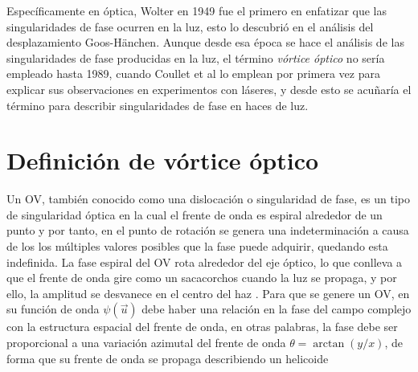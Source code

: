 
Específicamente en óptica, Wolter en 1949 \cite{Wolter1950}fue el primero en enfatizar que las singularidades de fase ocurren en la luz, esto lo descubrió en el análisis del desplazamiento Goos-Hänchen. Aunque desde esa época se hace el análisis de las singularidades de fase producidas en la luz, el término \textit{vórtice óptico} no sería empleado hasta 1989, cuando Coullet et al \cite{Coullet1994} lo emplean por primera vez para explicar sus observaciones en experimentos con láseres, y desde esto se acuñaría el término para describir singularidades de fase en haces de luz.

\section{Definición de vórtice óptico}
\label{sec:vortice_optico}

Un OV, también conocido como una dislocación o singularidad de fase, es un tipo de singularidad óptica en la cual el frente de onda es espiral alrededor de un punto y por tanto, en el punto de rotación se genera una indeterminación a causa de los los múltiples valores posibles que la fase puede adquirir, quedando esta indefinida. La fase espiral del OV rota alrededor del eje óptico, lo que conlleva a que el frente de onda gire como un sacacorchos cuando la luz se propaga, y por ello, la amplitud se desvanece en el centro del haz \cite{Cheng2013, Dennis2009}. Para que se genere un OV, en su función de onda $\psi(\vec{u})$ debe haber una relación en la fase del campo complejo con la estructura espacial del frente de onda, en otras palabras, la fase debe ser proporcional a una variación azimutal del frente de onda $\theta = \arctan(y/x)$, de forma que su frente de onda se propaga describiendo un helicoide

